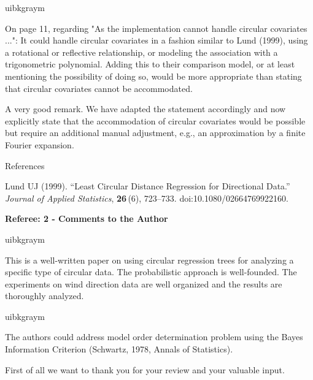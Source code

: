 \documentclass[english, noconfig]{uibklttr}
\newcommand{\section}[1]{{\Large{\textbf{#1}}}}
\newenvironment{re}{
    \begin{color}{uibkgraym}
        \itshape
}{
    \end{color}
}
\begin{document}
\vspace{0.5em}
\begin{re}
On page 11, regarding "As the implementation cannot handle circular
covariates ...": It could handle circular covariates in a fashion similar to
Lund (1999), using a rotational or reflective relationship, or modeling the
association with a trigonometric polynomial. Adding this to their comparison
model, or at least mentioning the possibility of doing so, would be more
appropriate than stating that circular covariates cannot be accommodated.
\end{re}

A very good remark. We have adapted the statement accordingly and now
explicitly state that the accommodation of circular covariates would be
possible but require an additional manual adjustment, e.g., an approximation by
a finite Fourier expansion.

\vspace{0.5cm}
References

Lund UJ (1999). ``Least Circular Distance Regression for Directional Data.''
\emph{Journal of Applied Statistics}, \textbf{26}\,(6), 723--733.
doi:10.1080/02664769922160.

\newpage

\section{Referee: 2 - Comments to the Author}

\begin{re}
This is a well-written paper on using circular regression trees for analyzing a
specific type of circular data. The probabilistic approach is well-founded. The
experiments on wind direction data are well organized and the results are
thoroughly analyzed.
\end{re}

\begin{re}
The authors could address model order determination problem using the
Bayes Information Criterion (Schwartz, 1978, Annals of Statistics).  
\end{re}

First of all we want to thank you for your review and your valuable input. 
\end{document}
